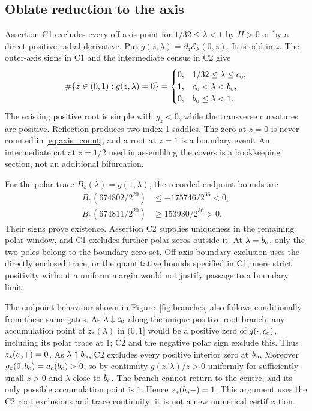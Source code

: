 \subsection{Oblate reduction to the axis}
Assertion C1 excludes every off-axis point for $1/32\le\lambda<1$ by $H>0$ or by a direct positive radial derivative. Put $g(z,\lambda)=\partial_z\mathcal E_\lambda(0,z)$. It is odd in $z$. The outer-axis signs in C1 and the intermediate census in C2 give
\begin{equation}\label{eq:axis_count}
 \#\{z\in(0,1):g(z,\lambda)=0\}
 =\begin{cases}
 0,&1/32\le\lambda\le c_{\mathrm o},\\
 1,&c_{\mathrm o}<\lambda<b_{\mathrm o},\\
 0,&b_{\mathrm o}\le\lambda<1.
 \end{cases}
\end{equation}
The existing positive root is simple with $g_z<0$, while the transverse curvatures are positive. Reflection produces two index 1 saddles. The zero at $z=0$ is never counted in \eqref{eq:axis_count}, and a root at $z=1$ is a boundary event. An intermediate cut at $z=1/2$ used in assembling the covers is a bookkeeping section, not an additional bifurcation.

For the polar trace $B_o(\lambda)=g(1,\lambda)$, the recorded endpoint bounds are
\begin{align}\label{eq:oblate_endpoint}
 B_o(674802/2^{20})&\le-175746/2^{36}<0,\\
 B_o(674811/2^{20})&\ge153930/2^{36}>0.\nonumber
\end{align}
Their signs prove existence. Assertion C2 supplies uniqueness in the remaining polar window, and C1 excludes further polar zeros outside it. At $\lambda=b_{\mathrm o}$, only the two poles belong to the boundary zero set. Off-axis boundary exclusion uses the directly enclosed trace, or the quantitative bounds specified in C1; mere strict positivity without a uniform margin would not justify passage to a boundary limit.

The endpoint behaviour shown in Figure~\ref{fig:branches} also follows
conditionally from these same gates.  As $\lambda\downarrow c_{\mathrm o}$ along the
unique positive-root branch, any accumulation point of $z_*(\lambda)$
in $(0,1]$ would be a positive zero of $g(\cdot,c_{\mathrm o})$, including its
polar trace at $1$; C2 and the negative polar sign exclude this.
Thus $z_*(c_{\mathrm o}+)=0$.  As $\lambda\uparrow b_{\mathrm o}$, C2 excludes every
positive interior zero at $b_{\mathrm o}$.  Moreover
$g_z(0,b_{\mathrm o})=a_c(b_{\mathrm o})>0$, so by continuity $g(z,\lambda)/z>0$
uniformly for sufficiently small $z>0$ and $\lambda$ close to $b_{\mathrm o}$.
The branch cannot return to the centre, and its only possible
accumulation point is $1$. Hence $z_*(b_{\mathrm o}-)=1$.
This argument uses the C2 root exclusions and trace continuity; it
is not a new numerical certification.

